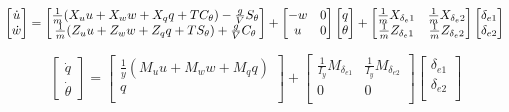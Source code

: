 \begin{equation}
    \begin{bmatrix}
        \dot u \\
        \dot w
    \end{bmatrix}
    =
    \begin{bmatrix}
        \frac{1}{m} (X_u u + X_w w + X_q q + T C_\theta) - \frac{g}{V} S_\theta \\
        \frac{1}{m} (Z_u u + Z_w w + Z_q q + T S_\theta) + \frac{g}{V} C_\theta
    \end{bmatrix}
    +
    \begin{bmatrix}
    - w & 0 \\
    u & 0
    \end{bmatrix}
    \begin{bmatrix}
      q  \\
      \theta
    \end{bmatrix}
    +
    \begin{bmatrix}
     \frac{1}{m} X_{\delta_e1} & \frac{1}{m} X_{\delta_e2} \\
     \frac{1}{m} Z_{\delta_e1} & \frac{1}{m} Z_{\delta_e2} \\
    \end{bmatrix}
    \begin{bmatrix}
        \delta_{e1} \\
        \delta_{e2} \\
    \end{bmatrix} \nonumber\\
\end{equation}

\begin{equation}
    \begin{bmatrix}
        \dot q \\
        \dot \theta
    \end{bmatrix}
    =
    \begin{bmatrix}
        \frac{1}{y} (M_u u + M_w w + M_q q) \\
        q \\
    \end{bmatrix}
    +
    \begin{bmatrix}
     \frac{1}{I_y} M_{\delta_{e1}} & \frac{1}{I_y} M_{\delta_{e2}} \\
      0 & 0 \\
    \end{bmatrix}
    \begin{bmatrix}
        \delta_{e1} \\
        \delta_{e2} \\
    \end{bmatrix}
\end{equation}

